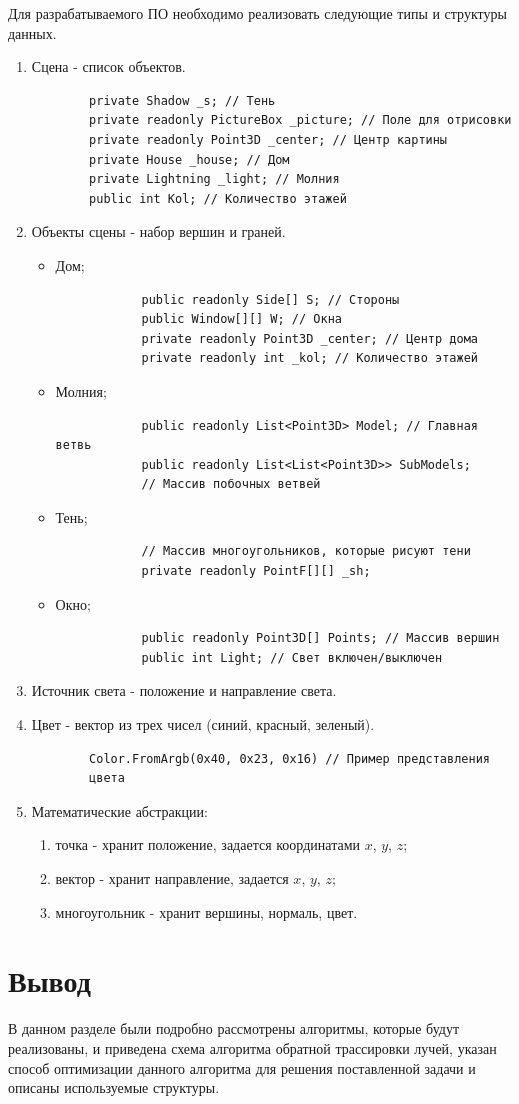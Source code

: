 Для разрабатываемого ПО необходимо реализовать следующие типы и структуры данных.
\begin{enumerate}
	\item Сцена - список объектов.
	
	\begin{verbatim}
		private Shadow _s; // Тень
		private readonly PictureBox _picture; // Поле для отрисовки
		private readonly Point3D _center; // Центр картины
		private House _house; // Дом
		private Lightning _light; // Молния
		public int Kol; // Количество этажей
	\end{verbatim}
	
	\item Объекты сцены - набор вершин и граней.
	
	\begin{itemize}
		\item Дом;
		\begin{verbatim}
			public readonly Side[] S; // Стороны
			public Window[][] W; // Окна
			private readonly Point3D _center; // Центр дома
			private readonly int _kol; // Количество этажей
		\end{verbatim}
		
		\item Молния;
		
		\begin{verbatim}
			public readonly List<Point3D> Model; // Главная ветвь
			public readonly List<List<Point3D>> SubModels; 
			// Массив побочных ветвей
		\end{verbatim}
		
		\item Тень;
		\begin{verbatim}
			// Массив многоугольников, которые рисуют тени
			private readonly PointF[][] _sh; 
		\end{verbatim}
		
		\item Окно;
		\begin{verbatim}
			public readonly Point3D[] Points; // Массив вершин
			public int Light; // Свет включен/выключен
		\end{verbatim}
	\end{itemize}
	\item Источник света - положение и направление света.
	\item Цвет - вектор из трех чисел (синий, красный, зеленый).
	\begin{verbatim}
		Color.FromArgb(0x40, 0x23, 0x16) // Пример представления 
		цвета
	\end{verbatim}
	\item Математические абстракции:
	\begin{enumerate}
		\item точка - хранит положение, задается координатами $x$, $y$, $z$;
		\item вектор - хранит направление, задается  $x$, $y$, $z$;
		
		\item многоугольник - хранит вершины, нормаль, цвет.
	\end{enumerate}
\end{enumerate}


\section{Вывод}
В данном разделе были подробно рассмотрены алгоритмы, которые будут реализованы, и приведена схема алгоритма обратной трассировки лучей, указан способ оптимизации данного алгоритма для решения поставленной задачи и описаны используемые структуры.